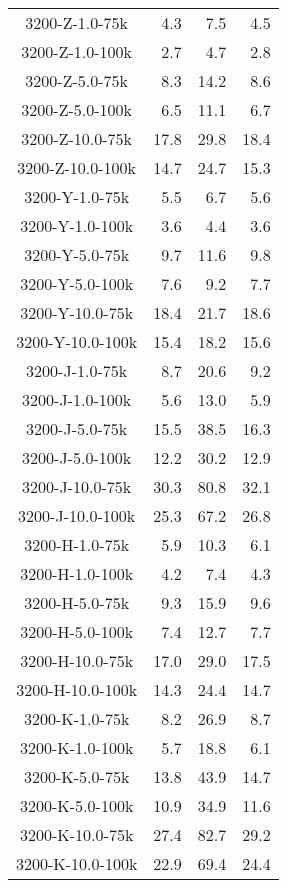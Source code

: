 \begin{longtable}{crrr}
    3200-Z-1.0-75k &   4.3 &    7.5 &   4.5 \\
    3200-Z-1.0-100k &   2.7 &    4.7 &   2.8 \\
    3200-Z-5.0-75k &   8.3 &   14.2 &   8.6 \\
    3200-Z-5.0-100k &   6.5 &   11.1 &   6.7 \\
    3200-Z-10.0-75k &  17.8 &   29.8 &  18.4 \\
    3200-Z-10.0-100k &  14.7 &   24.7 &  15.3 \\
    3200-Y-1.0-75k &   5.5 &    6.7 &   5.6 \\
    3200-Y-1.0-100k &   3.6 &    4.4 &   3.6 \\
    3200-Y-5.0-75k &   9.7 &   11.6 &   9.8 \\
    3200-Y-5.0-100k &   7.6 &    9.2 &   7.7 \\
    3200-Y-10.0-75k &  18.4 &   21.7 &  18.6 \\
    3200-Y-10.0-100k &  15.4 &   18.2 &  15.6 \\
    3200-J-1.0-75k &   8.7 &   20.6 &   9.2 \\
    3200-J-1.0-100k &   5.6 &   13.0 &   5.9 \\
    3200-J-5.0-75k &  15.5 &   38.5 &  16.3 \\
    3200-J-5.0-100k &  12.2 &   30.2 &  12.9 \\
    3200-J-10.0-75k &  30.3 &   80.8 &  32.1 \\
    3200-J-10.0-100k &  25.3 &   67.2 &  26.8 \\
    3200-H-1.0-75k &   5.9 &   10.3 &   6.1 \\
    3200-H-1.0-100k &   4.2 &    7.4 &   4.3 \\
    3200-H-5.0-75k &   9.3 &   15.9 &   9.6 \\
    3200-H-5.0-100k &   7.4 &   12.7 &   7.7 \\
    3200-H-10.0-75k &  17.0 &   29.0 &  17.5 \\
    3200-H-10.0-100k &  14.3 &   24.4 &  14.7 \\
    3200-K-1.0-75k &   8.2 &   26.9 &   8.7 \\
    3200-K-1.0-100k &   5.7 &   18.8 &   6.1 \\
    3200-K-5.0-75k &  13.8 &   43.9 &  14.7 \\
    3200-K-5.0-100k &  10.9 &   34.9 &  11.6 \\
    3200-K-10.0-75k &  27.4 &   82.7 &  29.2 \\
    3200-K-10.0-100k &  22.9 &   69.4 &  24.4 \\

\end{longtable}
